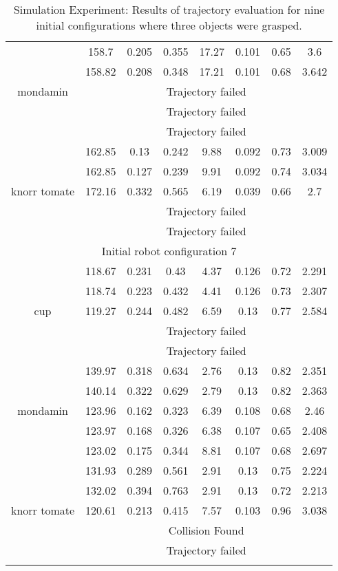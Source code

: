 {\begin{center}
\begin{longtable}[c]{ | c | c | c | c | c | c | c || c || }
\hline 
\multirow{5}{1.5cm}{mondamin}& 158.7 & 0.205 & 0.355 & 17.27 & 0.101 & 0.65 & 3.6 \\
& 158.82 & 0.208 & 0.348 & 17.21 & 0.101 & 0.68 & 3.642 \\
& \multicolumn{7}{c|}{Trajectory failed} \\
& \multicolumn{7}{c|}{Trajectory failed} \\
& \multicolumn{7}{c|}{Trajectory failed} \\
\hline 
\multirow{5}{1.5cm}{knorr tomate}& 162.85 & 0.13 & 0.242 & 9.88 & 0.092 & 0.73 & 3.009 \\
& 162.85 & 0.127 & 0.239 & 9.91 & 0.092 & 0.74 & 3.034 \\
& 172.16 & 0.332 & 0.565 & 6.19 & 0.039 & 0.66 & 2.7 \\
& \multicolumn{7}{c|}{Trajectory failed} \\
& \multicolumn{7}{c|}{Trajectory failed} \\
\hline 
\multicolumn{8}{|c|}{Initial robot configuration 7} \\
\hline
\multirow{5}{1.5cm}{cup}& 118.67 & 0.231 & 0.43 & 4.37 & 0.126 & 0.72 & 2.291 \\
& 118.74 & 0.223 & 0.432 & 4.41 & 0.126 & 0.73 & 2.307 \\
& 119.27 & 0.244 & 0.482 & 6.59 & 0.13 & 0.77 & 2.584 \\
& \multicolumn{7}{c|}{Trajectory failed} \\
& \multicolumn{7}{c|}{Trajectory failed} \\
\hline 
\multirow{5}{1.5cm}{mondamin}& 139.97 & 0.318 & 0.634 & 2.76 & 0.13 & 0.82 & 2.351 \\
& 140.14 & 0.322 & 0.629 & 2.79 & 0.13 & 0.82 & 2.363 \\
& 123.96 & 0.162 & 0.323 & 6.39 & 0.108 & 0.68 & 2.46 \\
& 123.97 & 0.168 & 0.326 & 6.38 & 0.107 & 0.65 & 2.408 \\
& 123.02 & 0.175 & 0.344 & 8.81 & 0.107 & 0.68 & 2.697 \\
\hline 
\multirow{5}{1.5cm}{knorr tomate}& 131.93 & 0.289 & 0.561 & 2.91 & 0.13 & 0.75 & 2.224 \\
& 132.02 & 0.394 & 0.763 & 2.91 & 0.13 & 0.72 & 2.213 \\
& 120.61 & 0.213 & 0.415 & 7.57 & 0.103 & 0.96 & 3.038 \\
& \multicolumn{7}{c|}{Collision Found} \\
& \multicolumn{7}{c|}{Trajectory failed} \\
\hline 
\caption{Simulation Experiment: Results of trajectory evaluation for nine initial configurations where three objects were grasped.}
\label{table:sim} 
\end{longtable}
\end{center}
}
